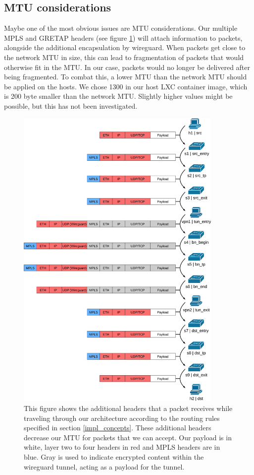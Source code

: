 \subsection{MTU considerations}
Maybe one of the most obvious issues are MTU considerations. Our multiple MPLS and GRETAP headers (see figure \ref{fig:packet_structure}) will attach information to packets, alongside the additional encapsulation by wireguard. When packets get close to the network MTU in size, this can lead to fragmentation of packets that would otherwise fit in the MTU. In our case, packets would no longer be delivered after being fragmented. To combat this, a lower MTU than the network MTU should be applied on the hosts. We chose 1300 in our host LXC container image, which is 200 byte smaller than the network MTU. Slightly higher values might be possible, but this has not been investigated.

\begin{figure}[hp]
  \centering
  \includegraphics[width=10cm]{images/chapter_6/packet_structure.png}
  \caption[Additional headers of packets]{This figure shows the additional headers that a packet receives while traveling through our architecture according to the routing rules specified in section \ref{impl_concepts}. These additional headers decrease our MTU for packets that we can accept. Our payload is in white, layer two to four headers in red and MPLS headers are in blue. Gray is used to indicate encrypted content within the wireguard tunnel, acting as a payload for the tunnel.}
  \label{fig:packet_structure}
\end{figure}

